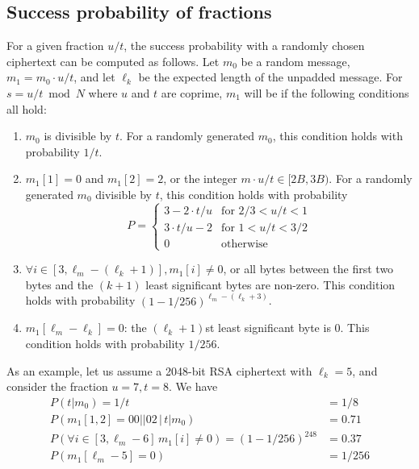 \label{sec:adapted-bb}

\subsection{Success probability of fractions}
\label{sec:fraction-probability}

For a given fraction $u/t$, the success probability with a randomly chosen
\tlsconform ciphertext can be computed as follows.  Let $m_0$ be a random
\tlsconform message, $m_1 = m_0 \cdot u/t$, and let $\ell_k$ be the expected
length of the unpadded message.  For $s = u/t \bmod N$ where $u$ and $t$ are coprime, $m_1$ will be \sslconform if the following conditions all hold:

\begin{enumerate}
	\item $m_0$ is divisible by $t$. For a randomly generated $m_0$, this
	condition holds with probability $1/t$.

	\item $m_1[1] = 0$ and $m_1[2] = 2$, or the integer
	$m \cdot u/t \in [2B, 3B)$.
	For a randomly generated $m_0$ divisible by $t$, this condition holds
	with probability
\begin{equation*}
P = 
\begin{cases}
3 - 2 \cdot t/u & \text{for }   2/3 < u/t < 1 \\
3 \cdot t/u - 2 & \text{for }   1 < u/t < 3/2 \\
0 & \text{otherwise}
\end{cases}
\label{eq:oracle}
\end{equation*} 

	\item $\forall i \in [3, \ell_m-(\ell_k+1)], m_1[i] \neq 0$, or all bytes
	between the first two bytes and the $(k+1)$ least significant bytes are
	non-zero.  This condition holds with probability
	$(1 - 1/256)^{\ell_m-(\ell_k+3)}$.

	\item $m_1[\ell_m-\ell_k] = 0$: the $(\ell_k+1)$st least significant
	byte is 0. This condition holds with probability $1/256$.
\end{enumerate}

\ifext
As an example, let us assume a 2048-bit RSA ciphertext with $\ell_k = 5$, and consider the fraction $u = 7, t = 8$.  We have
\begin{align*}
P(t|m_0)= 1/t &= 1/8 \\
P( m_1[1,2] = 00||02 \, \big\vert \, t|m_0) &= 0.71\\
P(\forall i \in [3, \ell_m-6] \, m_1[i] \neq 0) = (1 - 1/256)^{248} &= 0.37\\
P(m_1[\ell_m-5] = 0) &= 1/256
\end{align*}
\fi

